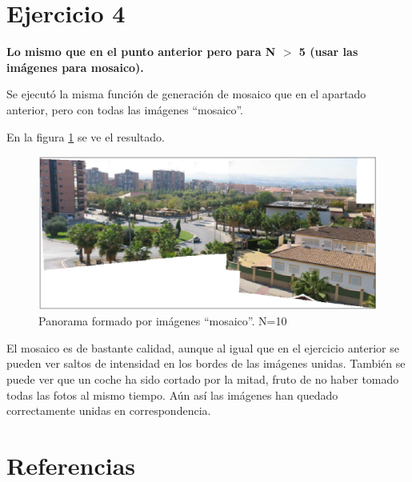 \documentclass[12pt,spanish]{article} %
\begin{document}

\section{Ejercicio 4}

\textbf{Lo mismo que en el punto anterior pero para N $>$ 5 (usar las imágenes para mosaico).}

Se ejecutó la misma función de generación de mosaico que en el apartado anterior, pero con todas las imágenes ``mosaico''.

En la figura \ref{fig:panorama2} se ve el resultado.

\begin{figure}[H]
  \begin{center}
  \includegraphics[scale=.55]{panorama2}
  \caption{Panorama formado por imágenes ``mosaico''. N=10}
  \label{fig:panorama2}
  \end{center}
\end{figure}

El mosaico es de bastante calidad, aunque al igual que en el ejercicio anterior se pueden ver saltos de intensidad en los bordes de las imágenes unidas. También se puede ver que un coche ha sido cortado por la mitad, fruto de no haber tomado todas las fotos al mismo tiempo. Aún así las imágenes han quedado correctamente unidas en correspondencia.

\newpage

\section{Referencias}
\end{document}

